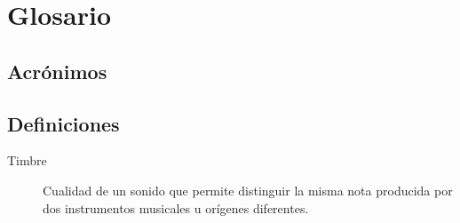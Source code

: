 \section{Glosario}

\subsection{Acrónimos}



\subsection{Definiciones}
\begin{description}
\item[Timbre] Cualidad de un sonido que permite distinguir la misma
  nota producida por dos instrumentos musicales u orígenes diferentes.

\end{description}